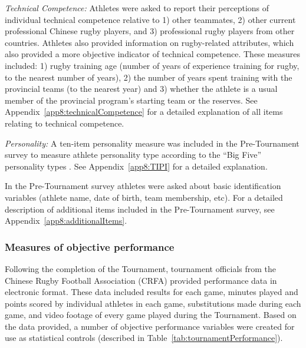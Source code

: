 \begin{CJK}{UTF8}{gbsn}
\textit{Technical Competence:} Athletes were asked to report their perceptions of individual technical competence relative to 1) other teammates, 2) other current professional Chinese rugby players, and  3) professional rugby players from other countries.  Athletes also provided information on rugby-related attributes, which also provided a more objective indicator of technical competence.  These measures included: 1) rugby training age (number of years of experience training for rugby, to the nearest number of years), 2) the number of years spent training with the provincial teams (to the nearest year) and 3) whether the athlete is a usual member of the provincial program's starting team or the reserves.  See Appendix~\ref{app8:technicalCompetence} for a detailed explanation of all items relating to technical competence.

\textit{Personality:} A ten-item personality measure was included in the Pre-Tournament survey to measure athlete personality type according to the ``Big Five'' personality types \citep[Ten Item Personality Index - TIPI.  The five types are: Extraversion, Agreeableness, Conscientiousness, Emotional Stability (Neuroticism reverse coded), and Openness to Experiences; see][]{Gosling2003}. See Appendix~\ref{app8:TIPI} for a detailed explanation.

In the Pre-Tournament survey athletes were asked about basic identification variables (athlete name, date of birth, team membership, etc).  For a detailed description of additional items included in the Pre-Tournament survey, see Appendix~\ref{app8:additionalItems}.



\subsubsection{\label{app8:objectivePerformance}Measures of objective performance}
Following the completion of the Tournament, tournament officials from the Chinese Rugby Football Association (CRFA) provided performance data in electronic format. These data included results for each game, minutes played and points scored by individual athletes in each game, substitutions made during each game, and video footage of every game played during the Tournament.  Based on the data provided, a number of objective performance variables were created for use as statistical controls (described in Table~\ref{tab:tournamentPerformance}).




\end{CJK}
